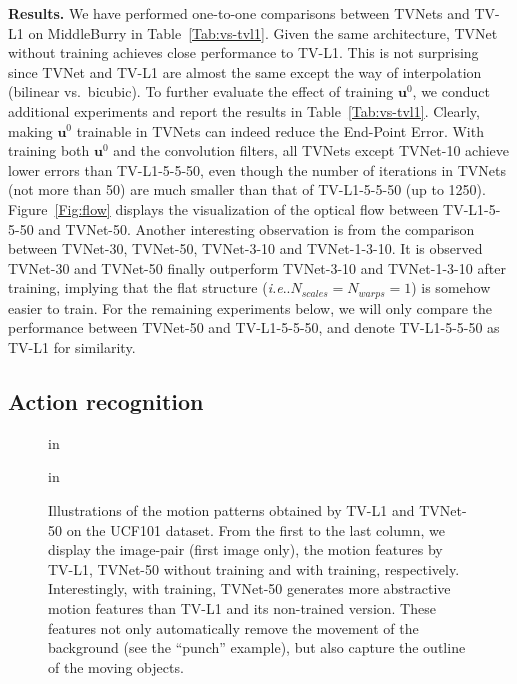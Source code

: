 \documentclass[10pt,twocolumn,letterpaper]{article}
\makeatletter
\DeclareRobustCommand\onedot{\futurelet\@let@token\@onedot}
\def\@onedot{\ifx\@let@token.\else.\null\fi\xspace}
\def\ie{\emph{i.e}\onedot} \def\Ie{\emph{I.e}\onedot}
\def\Vec#1{{\boldsymbol{#1}}}
\makeatother
\begin{document}
\textbf{Results.}
We have performed one-to-one comparisons between TVNets and TV-L1 on MiddleBurry in Table~\ref{Tab:vs-tvl1}. Given the same architecture, TVNet without training achieves close performance to TV-L1. This is not surprising since TVNet and TV-L1 are almost the same except the way of interpolation (bilinear vs.\ bicubic). To further evaluate the effect of training $\Vec{u}^0$, we conduct additional experiments and report the results in Table~\ref{Tab:vs-tvl1}. Clearly, making $\Vec{u}^0$ trainable in TVNets can indeed reduce the End-Point Error.
With training both $\Vec{u}^0$ and the convolution filters, all TVNets except TVNet-10 achieve lower errors than TV-L1-5-5-50, even though the number of iterations in TVNets (not more than 50) are much smaller than that of TV-L1-5-5-50 (up to 1250).
Figure~\ref{Fig:flow} displays the visualization of the optical flow between TV-L1-5-5-50 and TVNet-50.
Another interesting observation is from the comparison between  TVNet-30, TVNet-50, TVNet-3-10 and TVNet-1-3-10. It is observed TVNet-30 and TVNet-50 finally outperform TVNet-3-10 and TVNet-1-3-10 after training,  implying that the flat structure (\ie $N_{scales}=N_{warps}=1$) is somehow easier to train.
For the remaining experiments below, we will only compare the performance between TVNet-50 and TV-L1-5-5-50, and denote TV-L1-5-5-50 as TV-L1 for similarity.







\subsection{Action recognition}


\begin{figure*}[th!]
\begin{center}
 in
\caption{Illustrations of the motion patterns obtained by TV-L1 and TVNet-50 on the UCF101 dataset. From the first to the last column, we display the image-pair (first image only), the motion features by TV-L1, TVNet-50 without training and with training, respectively. Interestingly, with training, TVNet-50 generates more abstractive motion features than TV-L1 and its non-trained version. These features not only automatically remove the movement of the background (see the ``punch'' example), but also capture the outline of the moving objects.}
\label{Fig:representation}
\end{center}
 in
\end{figure*}
\end{document}
